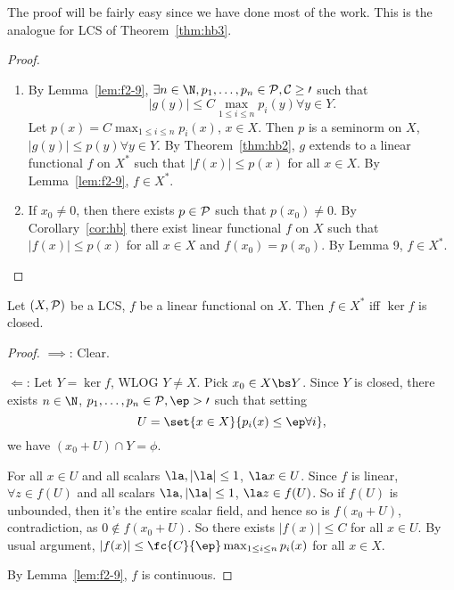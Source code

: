 The proof will be fairly easy since we have done most of the work. This is the analogue for LCS of Theorem~\ref{thm:hb3}.
\begin{proof}
\begin{enumerate}
\item
By Lemma~\ref{lem:f2-9}, $\exists n\in \N,p_1,\ldots, p_n\in \cal P,C\ge 0$ such that
\[
|g(y)|\le C\max_{1\le i\le n}p_i(y)\forall y\in Y.
\]
Let $p(x)=C\max_{1\le i\le n}p_i(x)$, $x\in X$. Then $p$ is a seminorm on $X$, $|g(y)|\le p(y)\forall y\in Y$. By Theorem~\ref{thm:hb2}, $g$ extends to a linear functional $f$ on $X^*$ such that $|f(x)|\le p(x)$ for all $x\in X$. By Lemma~\ref{lem:f2-9}, $f\in X^*$. 
\item
If $x_0\ne 0$, then there exists $p\in \cal P$ such that $p(x_0)\ne 0$. By Corollary~\ref{cor:hb} there exist linear functional $f$ on $X$ such that $|f(x)|\le p(x)$ for all $x\in X$ and $f(x_0)=p(x_0)$. By Lemma 9, $f\in X^*$.
\end{enumerate}
\end{proof}
\begin{thm}
Let $(X,\cal P)$ be a LCS, $f$ be a linear functional on $X$. Then $f\in X^*$ iff $\ker f$ is closed.
\end{thm}
\begin{proof}
$\implies$: Clear.

$\Leftarrow$: Let $Y=\ker f$, WLOG $Y\ne X$. Pick $x_0\in X\bs Y$. Since $Y$ is closed, there exists $n\in \N$, $p_1,\ldots, p_n\in \cal P,\ep>0$ such that setting
\[
U=\set{x\in X}{p_i(x)\le \ep \forall i},
\]
we have $(x_0+U)\cap Y=\phi$.

For all $x\in U$ and all scalars $\la, |\la|\le 1$, $\la x\in U$. Since $f$ is linear, $\forall z\in f(U)$ and all scalars $\la,|\la|\le 1$, $\la z\in f(U)$. 
So if $f(U)$ is unbounded, then it's the entire scalar field, and hence so is $f(x_0+U)$, contradiction, as $0\nin f(x_0+U)$. So there exists $|f(x)|\le C$ for all $x\in U$. By usual argument, $|f(x)|\le \fc{C}{\ep}\max_{1\le i\le n}p_i(x)$ for all $x\in X$. 

By Lemma~\ref{lem:f2-9}, $f$ is continuous. 
\end{proof}







